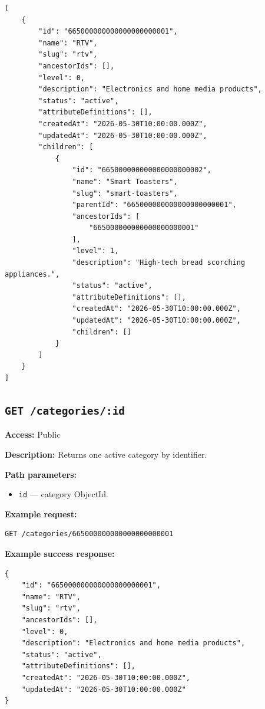 \begin{verbatim}
[
    {
        "id": "665000000000000000000001",
        "name": "RTV",
        "slug": "rtv",
        "ancestorIds": [],
        "level": 0,
        "description": "Electronics and home media products",
        "status": "active",
        "attributeDefinitions": [],
        "createdAt": "2026-05-30T10:00:00.000Z",
        "updatedAt": "2026-05-30T10:00:00.000Z",
        "children": [
            {
                "id": "665000000000000000000002",
                "name": "Smart Toasters",
                "slug": "smart-toasters",
                "parentId": "665000000000000000000001",
                "ancestorIds": [
                    "665000000000000000000001"
                ],
                "level": 1,
                "description": "High-tech bread scorching appliances.",
                "status": "active",
                "attributeDefinitions": [],
                "createdAt": "2026-05-30T10:00:00.000Z",
                "updatedAt": "2026-05-30T10:00:00.000Z",
                "children": []
            }
        ]
    }
]
\end{verbatim}

\subsection{\texttt{GET /categories/:id}}

\textbf{Access:} Public

\textbf{Description:} Returns one active category by identifier.

\textbf{Path parameters:}

\begin{itemize}
    \item \texttt{id} --- category ObjectId.
\end{itemize}

\textbf{Example request:}

\begin{verbatim}
GET /categories/665000000000000000000001
\end{verbatim}

\textbf{Example success response:}

\begin{verbatim}
{
    "id": "665000000000000000000001",
    "name": "RTV",
    "slug": "rtv",
    "ancestorIds": [],
    "level": 0,
    "description": "Electronics and home media products",
    "status": "active",
    "attributeDefinitions": [],
    "createdAt": "2026-05-30T10:00:00.000Z",
    "updatedAt": "2026-05-30T10:00:00.000Z"
}
\end{verbatim}

